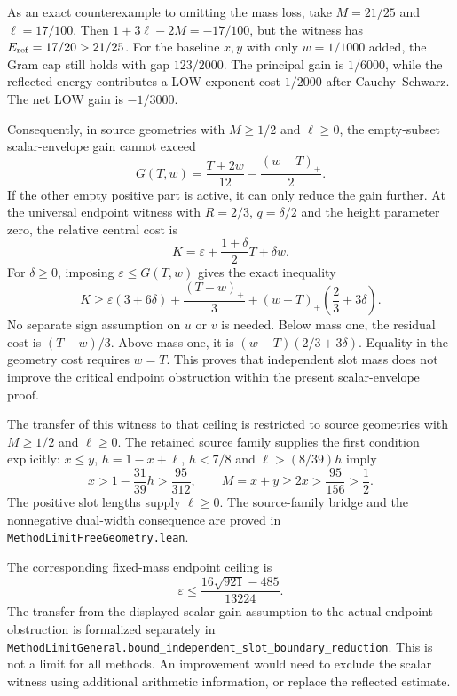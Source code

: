 \documentclass[11pt]{article}
\begin{document}
As an exact counterexample to omitting the mass loss, take
$M=21/25$ and $\ell=17/100$.  Then
$1+3\ell-2M=-17/100$, but the witness has
$E_{\rm ref}=17/20>21/25$.
For the baseline $x,y$ with only $w=1/1000$ added, the Gram cap still
holds with gap $123/2000$.  The principal gain is $1/6000$, while the
reflected energy contributes a LOW exponent cost $1/2000$ after
Cauchy--Schwarz.  The net LOW gain is $-1/3000$.

Consequently, in source geometries with $M\ge1/2$ and $\ell\ge0$,
the empty-subset scalar-envelope gain cannot exceed
\[
 G(T,w)=\frac{T+2w}{12}-\frac{(w-T)_+}{2}.
\]
If the other empty positive part is active, it can only reduce the gain
further.  At the universal endpoint witness with $R=2/3$, $q=\delta/2$
and the height parameter zero, the relative central cost is
\[
 K=\varepsilon+\frac{1+\delta}{2}T+\delta w.
\]
For $\delta\ge0$, imposing $\varepsilon\le G(T,w)$ gives the exact
inequality
\[
 K\ge\varepsilon(3+6\delta)
   +\frac{(T-w)_+}{3}
   +(w-T)_+\left(\frac23+3\delta\right).
\]
No separate sign assumption on $u$ or $v$ is needed.  Below mass one,
the residual cost is $(T-w)/3$.  Above mass one, it is
$(w-T)(2/3+3\delta)$.  Equality in the geometry cost requires $w=T$.
This proves that independent slot mass does not improve the critical
endpoint obstruction within the present scalar-envelope proof.

The transfer of this witness to that ceiling is restricted to source
geometries with $M\ge1/2$ and $\ell\ge0$.
The retained source family supplies the first condition explicitly:
$x\le y$, $h=1-x+\ell$, $h<7/8$ and $\ell>(8/39)h$ imply
\[
 x>1-\frac{31}{39}h>\frac{95}{312},\qquad
 M=x+y\ge2x>\frac{95}{156}>\frac12.
\]
The positive slot lengths supply $\ell\ge0$.
The source-family bridge and the nonnegative dual-width consequence are
proved in \nolinkurl{MethodLimitFreeGeometry.lean}.

The corresponding fixed-mass endpoint ceiling is
\[
 \varepsilon\le\frac{16\sqrt{921}-485}{13224}.
\]
The transfer from the displayed scalar gain assumption to the actual
endpoint obstruction is formalized separately in
\nolinkurl{MethodLimitGeneral.bound_independent_slot_boundary_reduction}.
This is not a limit for all methods.  An improvement would need to
exclude the scalar witness using additional arithmetic information, or
replace the reflected estimate.
\end{document}
